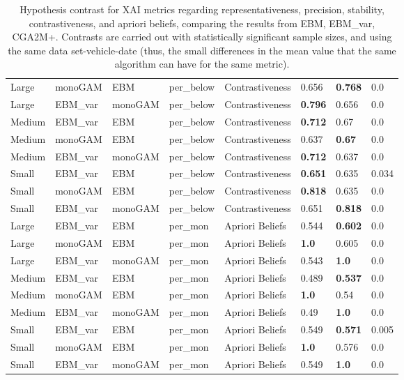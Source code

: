 \begin{table}[]
{\begin{tabular}{@{}llllllll@{}}
Large  & monoGAM        & EBM     & per\_below        & Contrastiveness    & 0.656          & \textbf{0.768} & 0.0   \\
Large  & EBM\_var & monoGAM & per\_below        & Contrastiveness    & \textbf{0.796} & 0.656          & 0.0   \\
Medium & EBM\_var & EBM     & per\_below        & Contrastiveness    & \textbf{0.712} & 0.67           & 0.0   \\
Medium & monoGAM        & EBM     & per\_below        & Contrastiveness    & 0.637          & \textbf{0.67}  & 0.0   \\
Medium & EBM\_var & monoGAM & per\_below        & Contrastiveness    & \textbf{0.712} & 0.637          & 0.0   \\
Small  & EBM\_var & EBM     & per\_below        & Contrastiveness    & \textbf{0.651} & 0.635          & 0.034 \\
Small  & monoGAM        & EBM     & per\_below        & Contrastiveness    & \textbf{0.818} & 0.635          & 0.0   \\
Small  & EBM\_var & monoGAM & per\_below        & Contrastiveness    & 0.651          & \textbf{0.818} & 0.0   \\
Large  & EBM\_var & EBM     & per\_mon          & Apriori Beliefs    & 0.544          & \textbf{0.602} & 0.0   \\
Large  & monoGAM        & EBM     & per\_mon          & Apriori Beliefs    & \textbf{1.0}   & 0.605          & 0.0   \\
Large  & EBM\_var & monoGAM & per\_mon          & Apriori Beliefs    & 0.543          & \textbf{1.0}   & 0.0   \\
Medium & EBM\_var & EBM     & per\_mon          & Apriori Beliefs    & 0.489          & \textbf{0.537} & 0.0   \\
Medium & monoGAM        & EBM     & per\_mon          & Apriori Beliefs    & \textbf{1.0}   & 0.54           & 0.0   \\
Medium & EBM\_var & monoGAM & per\_mon          & Apriori Beliefs    & 0.49           & \textbf{1.0}   & 0.0   \\
Small  & EBM\_var & EBM     & per\_mon          & Apriori Beliefs    & 0.549          & \textbf{0.571} & 0.005 \\
Small  & monoGAM        & EBM     & per\_mon          & Apriori Beliefs    & \textbf{1.0}   & 0.576          & 0.0   \\
Small  & EBM\_var & monoGAM & per\_mon          & Apriori Beliefs    & 0.549          & \textbf{1.0}   & 0.0   \\ \bottomrule

\end{tabular}%
}
\caption{Hypothesis contrast for XAI metrics regarding representativeness, precision, stability, contrastiveness, and apriori beliefs, comparing the results from EBM, EBM\_var, CGA2M+. Contrasts are carried out with statistically significant sample sizes, and using the same data set-vehicle-date (thus, the small differences in the mean value that the same algorithm can have for the same metric).}
\label{table:annex-xai-metrics-contrast}
\end{table}

